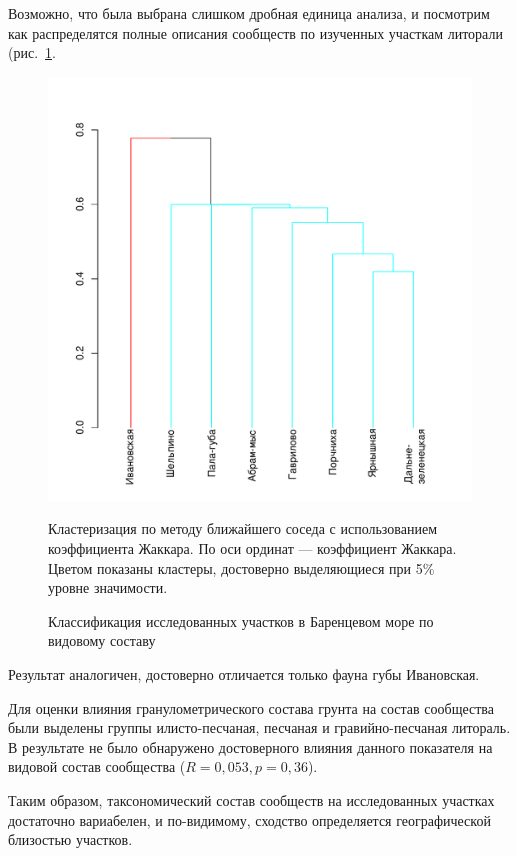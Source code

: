 Возможно, что была выбрана слишком дробная единица анализа, и посмотрим как распределятся полные описания сообществ по изученных участкам литорали (рис.~\ref{ris:cluster_barents_species_sites}. 
	\begin{figure}[p]
		\begin{center}
			\includegraphics{../Barenc_Sea/soobshestvo/Barents_fauna_sites_jaccard_single_1.pdf}
		\end{center}
	\caption{Классификация исследованных участков в Баренцевом море по видовому составу}
	\label{ris:cluster_barents_species_sites}

	\footnotesize{Кластеризация по методу ближайшего соседа с использованием коэффициента Жаккара. По оси ординат --- коэффициент Жаккара. Цветом показаны кластеры, достоверно выделяющиеся при 5\% уровне значимости.}
	\end{figure}
Результат аналогичен, достоверно отличается только фауна губы Ивановская.


Для оценки влияния гранулометрического состава грунта на состав сообщества были выделены группы илисто-песчаная, песчаная и гравийно-песчаная литораль. 
В результате не было обнаружено достоверного влияния данного показателя на видовой состав сообщества ($R=0,053, p=0,36$).
	
Таким образом, таксономический состав сообществ на исследованных участках достаточно вариабелен, и по-видимому, сходство определяется географической близостью участков. 

